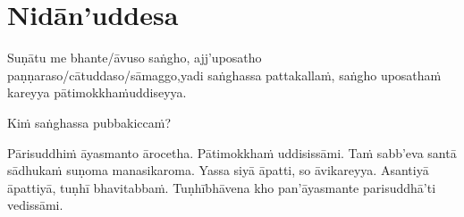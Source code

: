 
\section{Nidān'uddesa}
\label{nidan'uddesa}

\ifninebythirteenversion\vspace{0.2em}\fi
\ifafiveversion\vspace{0.2em}\fi

Suṇātu me bhante/āvuso saṅgho, ajj'uposatho paṇṇaraso/cātuddaso/sāmaggo,\makeatletter\hyperlink{endnote15-appendix}\makeatother \thinspace yadi saṅghassa pattakallaṁ, saṅgho uposathaṁ kareyya pātimokkhaṁ\makeatletter\hyperlink{endnote14-appendix}\makeatother \thinspace uddiseyya.

Kiṁ saṅghassa pubbakiccaṁ?

Pārisuddhiṁ āyasmanto ārocetha. Pātimokkhaṁ uddisissāmi. Taṁ sabb'eva santā sādhukaṁ suṇoma manasikaroma. Yassa siyā āpatti, so āvikareyya\makeatletter\hyperlink{endnote16-appendix}\makeatother \thinspace. Asantiyā āpattiyā, tuṇhī bhavitabbaṁ. Tuṇhībhāvena kho pan'āyasmante parisuddhā'ti vedissāmi.

